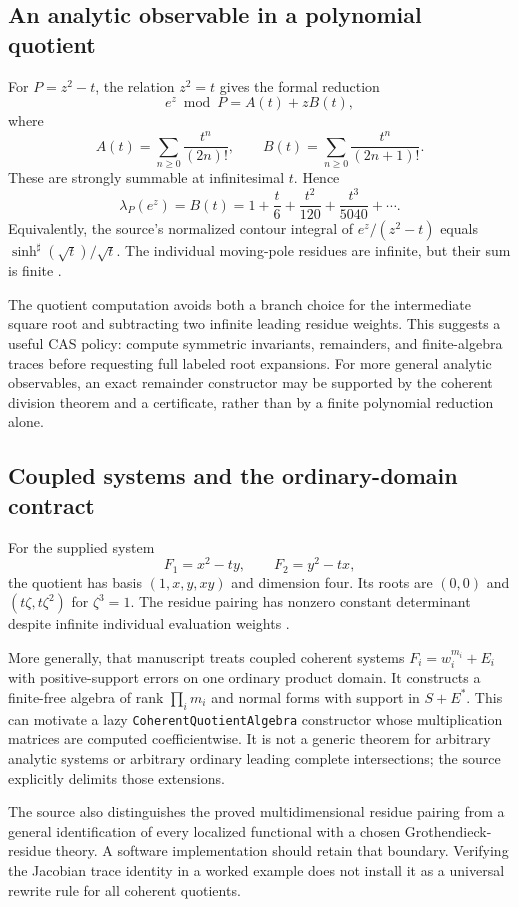 \documentclass[11pt,letterpaper]{article}
\numberwithin{equation}{section}
\theoremstyle{definition}
\theoremstyle{remark}\newtheorem{remark}[theorem]{Remark}
\newcommand{\sh}{^{\sharp}}
\begin{document}
\subsection{An analytic observable in a polynomial quotient}
For $P=z^2-t$, the relation $z^2=t$ gives the formal reduction
\[
 e^z\bmod P=A(t)+zB(t),
\]
where
\[
 A(t)=\sum_{n\ge0}\frac{t^n}{(2n)!},\qquad
 B(t)=\sum_{n\ge0}\frac{t^n}{(2n+1)!}.
\]
These are strongly summable at infinitesimal $t$. Hence
\begin{equation}\label{eq:residueexample}
 \lambda_P(e^z)=B(t)
 =1+\frac t6+\frac{t^2}{120}+\frac{t^3}{5040}+\cdots.
\end{equation}
Equivalently, the source's normalized contour integral of
$e^z/(z^2-t)$ equals $\sinh\sh(\sqrt t)/\sqrt t$. The individual moving-pole
residues are infinite, but their sum is finite \cite{SourceAnalysis}.

The quotient computation avoids both a branch choice for the intermediate
square root and subtracting two infinite leading residue weights. This
suggests a useful CAS policy: compute symmetric invariants, remainders, and
finite-algebra traces before requesting full labeled root expansions.
For more general analytic observables, an exact remainder constructor may
be supported by the coherent division theorem and a certificate, rather than
by a finite polynomial reduction alone.

\subsection{Coupled systems and the ordinary-domain contract}
For the supplied system
\[
 F_1=x^2-ty,\qquad F_2=y^2-tx,
\]
the quotient has basis $(1,x,y,xy)$ and dimension four. Its roots are
$(0,0)$ and $(t\zeta,t\zeta^2)$ for $\zeta^3=1$. The residue pairing has
nonzero constant determinant despite infinite individual evaluation weights
\cite{SourceResearch}.

More generally, that manuscript treats coupled coherent systems
$F_i=w_i^{m_i}+E_i$ with positive-support errors on one ordinary product
domain. It constructs a finite-free algebra of rank $\prod_i m_i$ and
normal forms with support in $S+E^*$. This can motivate a lazy
\texttt{CoherentQuotientAlgebra} constructor whose multiplication matrices
are computed coefficientwise. It is not a generic theorem for arbitrary
analytic systems or arbitrary ordinary leading complete intersections; the
source explicitly delimits those extensions.

The source also distinguishes the proved multidimensional residue pairing
from a general identification of every localized functional with a chosen
Grothendieck-residue theory. A software implementation should retain that
boundary. Verifying the Jacobian trace identity in a worked example does
not install it as a universal rewrite rule for all coherent quotients.
\end{document}
